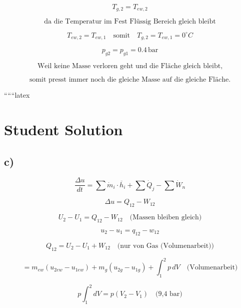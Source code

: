 \[
T_{g,2} = T_{ew,2}
\]

\[
\text{da die Temperatur im Fest Flüssig Bereich gleich bleibt}
\]

\[
T_{ew,2} = T_{ew,1} \quad \text{somit} \quad T_{g,2} = T_{ew,1} = 0^\circ C
\]

\[
p_{g2} = p_{g1} = 0.4 \, \text{bar}
\]

\[
\text{Weil keine Masse verloren geht und die Fläche gleich bleibt,}
\]

\[
\text{somit presst immer noch die gleiche Masse auf die gleiche Fläche.}
\]

``````latex

\section*{Student Solution}

\subsection*{c)}

\begin{equation*}
\frac{\Delta u}{dt} = \sum \dot{m}_i \cdot \overline{h}_i + \sum \dot{Q}_j - \sum \dot{W}_n
\end{equation*}

\begin{equation*}
\Delta u = Q_{12} - W_{12}
\end{equation*}

\begin{equation*}
U_2 - U_1 = Q_{12} - W_{12} \quad \text{(Massen bleiben gleich)}
\end{equation*}

\begin{equation*}
u_2 - u_1 = q_{12} - w_{12}
\end{equation*}

\begin{equation*}
Q_{12} = U_2 - U_1 + W_{12} \quad \text{(nur von Gas (Volumenarbeit))}
\end{equation*}

\begin{equation*}
= m_{ew} (u_{2ew} - u_{1ew}) + m_g (u_{2g} - u_{1g}) + \int_1^2 p \, dV \quad \text{(Volumenarbeit)}
\end{equation*}

\begin{equation*}
p \int_1^2 dV = p (V_2 - V_1) \quad \text{(9,4 bar)}
\end{equation*}

